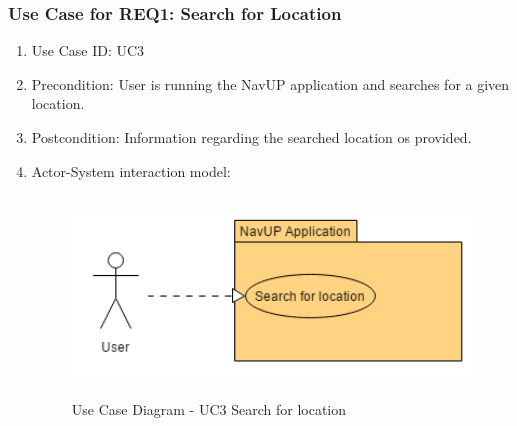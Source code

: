 \documentclass[11pt, a4paper]{article}
\begin{document}
		
		\newpage
		\subsubsection{Use Case for REQ1: Search for Location}
			\begin{enumerate}
			\renewcommand{\labelenumi}{{\textbf{\arabic{enumi}.}}}
			\item Use Case ID: UC3
			\item Precondition: User is running the NavUP application and searches for a given location.
			\item Postcondition: Information regarding  the searched location os provided.
			\item Actor-System interaction model:
				\graphicspath{ {./Images/User/} }
				\begin{figure}[h]
				\caption{Use Case Diagram -  UC3  Search for location}
				\includegraphics[height = 200px]{SearchForLocation.png}
				\end{figure}
			\end{enumerate}
\end{document}
